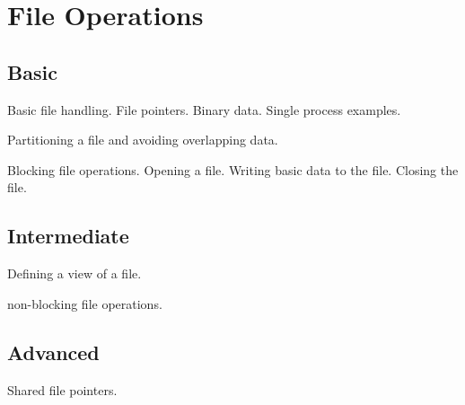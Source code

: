 \chapter{File Operations}

\section{Basic}

Basic file handling. File pointers. Binary data. Single process examples.

Partitioning a file and avoiding overlapping data.

Blocking file operations. Opening a file. Writing basic data to the file. Closing the file.

\section{Intermediate}

Defining a view of a file. 

non-blocking file operations.

\section{Advanced}

Shared file pointers.

